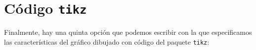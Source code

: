 \documentclass[12pt,letterpaper]{article}
\begin{document}
\section{Código \texttt{tikz}}

Finalmente, hay una quinta opción que podemos escribir con la que especificamos las características del gráfico dibujado con código del paquete \texttt{tikz}:

\begin{center}
 
 
 
 
\end{center}
\end{document}
